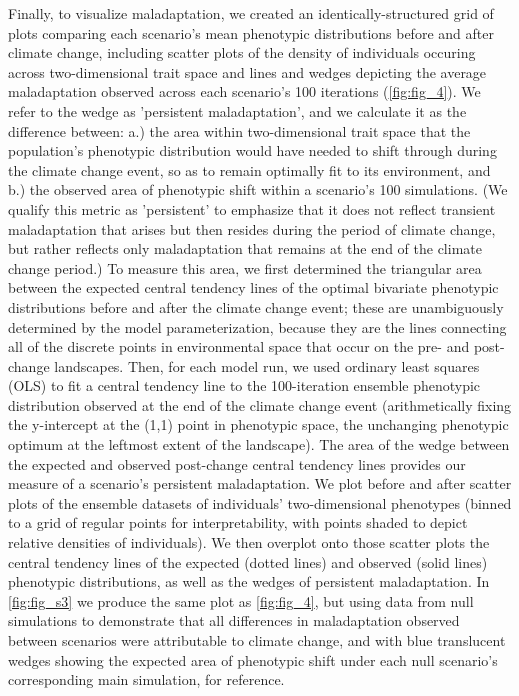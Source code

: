\documentclass[9pt,twocolumn,twoside,lineno]{pnas-new}
\begin{document}
{Finally, to visualize maladaptation, we created an identically-structured
grid of plots comparing each scenario's
mean phenotypic distributions before and after climate change,
including scatter plots of the density of individuals occuring across
two-dimensional trait space and lines and wedges depicting the average maladaptation
observed across each scenario's 100 iterations (\ref{fig:fig_4}).
We refer to the wedge as 'persistent maladaptation',
and we calculate it as the difference between: a.) the area 
within two-dimensional trait space that the population’s phenotypic distribution 
would have needed to shift through during the climate change event, so as to remain 
optimally fit to its environment, and b.) the observed area of phenotypic shift within
a scenario's 100 simulations.
(We qualify this metric as 'persistent' to emphasize that it does
not reflect transient maladaptation that arises but then
resides during the period of climate change, but rather reflects
only maladaptation that remains at the end of the climate change period.)
To measure this area, we first determined the triangular area between 
the expected central tendency lines of the optimal bivariate phenotypic distributions
before and after the climate change event;
these are unambiguously determined by the model parameterization, because
they are the lines connecting all of the discrete 
points in environmental space that occur on the pre- and post-change landscapes.
Then, for each model run, we used ordinary least squares (OLS)
to fit a central tendency line to the 100-iteration ensemble phenotypic distribution
observed at the end of the climate change event
(arithmetically fixing the y-intercept at the (1,1) point in phenotypic 
space, the unchanging phenotypic optimum at the leftmost extent of the landscape).
The area of the wedge between the expected and observed post-change central tendency
lines provides our measure of a scenario's persistent maladaptation.
We plot before and after scatter plots of the ensemble datasets
of individuals' two-dimensional phenotypes
(binned to a grid of regular points for interpretability, with points
shaded to depict relative densities of individuals).
We then overplot onto those scatter plots the central tendency lines of
the expected (dotted lines) and observed (solid lines) phenotypic distributions,
as well as the wedges of persistent maladaptation.
In \ref{fig:fig_s3} we produce the same plot as \ref{fig:fig_4},
but using data from null simulations to demonstrate that all differences
in maladaptation observed between scenarios were attributable to climate change,
and with blue translucent wedges showing the expected area of phenotypic shift
under each null scenario's corresponding main simulation, for reference.

}
\end{document}
